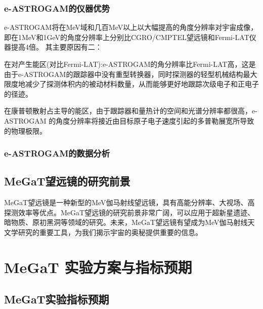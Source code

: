 \subsubsection{e-ASTROGAM的仪器优势}
e-ASTROGAM将在MeV域和几百MeV以上以大幅提高的角度分辨率对宇宙成像，即在1MeV和1GeV的角度分辨率上分别比CGRO/CMPTEL望远镜和Fermi-LAT仪器提高4倍。
其主要原因有二：\par
在对产生能区(对比Fermi-LAT):e-ASTROGAM的角分辨率比Fermi-LAT高，这是由于e-ASTROGAM的跟踪器中没有重型转换器，同时探测器的轻型机械结构最大限度地减少了探测体积内的被动材料数量，从而能够更好地跟踪次级电子和正电子的径迹。\par
在康普顿散射占主导的能区，由于跟踪器和量热计的空间和光谱分辨率都很高，e-ASTROGAM 的角度分辨率将接近由目标原子电子速度引起的多普勒展宽所导致的物理极限。
\subsubsection{e-ASTROGAM的数据分析}



\subsection{MeGaT望远镜的研究前景}
MeGaT望远镜是一种新型的MeV伽马射线望远镜，具有高能分辨率、大视场、高探测效率等优点。MeGaT望远镜的研究前景非常广阔，可以应用于超新星遗迹、暗物质、原初黑洞等领域的研究。未来，MeGaT望远镜有望成为MeV伽马射线天文学研究的重要工具，为我们揭示宇宙的奥秘提供重要的信息。\par


\section{MeGaT 实验方案与指标预期}
\label{sec:explanation}

\subsection{MeGaT实验指标预期}








